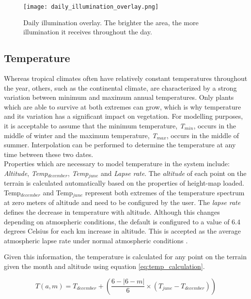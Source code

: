 \begin{figure}
\center
	\texttt{[image: daily\_illumination\_overlay.png]}
	\caption{ Daily illumination overlay. The brighter the area, the more illumination it receives throughout the day. }
	\label{fig:overlay_daily_illumination}
\end{figure}

\subsection{Temperature}

Whereas tropical climates often have relatively constant temperatures throughout the year, others, such as the continental climate, are characterized by a strong variation between minimum and maximum annual temperatures. Only plants which are able to survive at both extremes can grow, which is why temperature and its variation has a significant impact on vegetation. For modelling purposes, it is acceptable to assume that the minimum temperature, \textit{T$_{min}$}, occurs in the middle of winter and the maximum temperature, \textit{T$_{max}$}, occurs in the middle of summer. Interpolation can be performed to determine the temperature at any time between these two dates.\\

Properties which are necessary to model temperature in the system include: \textit{Altitude}, \textit{Temp$_{december}$}, \textit{Temp$_{june}$} and \textit{Lapse rate}. The \textit{altitude} of each point on the terrain is calculated automatically based on the properties of height-map loaded. Temp$_{december}$ and Temp$_{june}$ represent both extremes of the temperature spectrum at zero meters of altitude and need to be configured by the user. The \textit{lapse rate} defines the decrease in temperature with altitude. Although this changes depending on atmospheric conditions, the default is configured to a value of 6.4 degrees Celsius for each km increase in altitude. This is accepted as the average atmospheric lapse rate under normal atmospheric conditions \protect\footnotemark.\\

Given this information, the temperature is calculated for any point on the terrain given the month and altitude using equation \ref{eq:temp_calculation}. 

\begin{equation} \label{eq:temp_calculation}
	T(a,m) = T_{december} + ( \frac{6 - |6-m|}{6} \times (T_{june} - T_{december}))
\end{equation}

